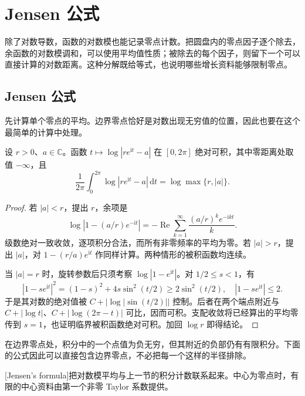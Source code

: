 \section{Jensen 公式}
\label{b3:sec:1802}

除了对数导数，函数的对数模也能记录零点计数。把圆盘内的零点因子逐个除去，余函数的对数模调和，可以使用平均值性质；被除去的每个因子，则留下一个可以直接计算的对数距离。这种分解既给等式，也说明哪些增长资料能够限制零点。

\subsection{Jensen 公式}
\label{b3:subsec:180201}

先计算单个零点的平均。边界零点恰好是对数出现无穷值的位置，因此也要在这个最简单的计算中处理。

\begin{lemma}[圆周对数平均]\label{b3:lem:18-circle-log-mean}
设 \(r>0\)、\(a\in\mathbb C\)。函数 \(t\mapsto\log|re^{\mathrm it}-a|\) 在 \([0,2\pi]\) 绝对可积，其中零距离处取值 \(-\infty\)，且
\begin{equation}\label{b3:eq:18-circle-log-mean}
 \frac1{2\pi}\int_0^{2\pi}\log|re^{\mathrm it}-a|\,\mathrm dt
 =\log\max\{r,|a|\}.
\end{equation}
\end{lemma}
\begin{proof}
若 \(|a|<r\)，提出 \(r\)，余项是
\[
 \log|1-(a/r)e^{-\mathrm it}|
 =-\operatorname{Re}\sum_{k=1}^{\infty}
       \frac{(a/r)^k e^{-\mathrm ikt}}k.
\]
级数绝对一致收敛，逐项积分合法，而所有非零频率的平均为零。若 \(|a|>r\)，提出 \(|a|\)，对 \(1-(r/a)e^{\mathrm it}\) 作同样计算。两种情形的被积函数均连续。

当 \(|a|=r\) 时，旋转参数后只须考察 \(\log|1-e^{\mathrm it}|\)。对 \(1/2\le s<1\)，有
\[
 |1-se^{\mathrm it}|^2=(1-s)^2+4s\sin^2(t/2)
 \ge2\sin^2(t/2),\quad |1-se^{\mathrm it}|\le2.
\]
于是其对数的绝对值被
\(C+|\log|\sin(t/2)||\) 控制。后者在两个端点附近与
\(C+|\log t|\)、\(C+|\log(2\pi-t)|\) 可比，因而可积。支配收敛将已经算出的平均零传到 \(s=1\)，也证明临界被积函数绝对可积。加回 \(\log r\) 即得结论。
\end{proof}

在边界零点处，积分中的一个点值为负无穷，但其附近的负部仍有有限积分。下面的公式因此可以直接包含边界零点，不必把每一个这样的半径排除。

\ProseParagraphBreak
{}[Jensen's formula]把对数模平均与上一节的积分计数联系起来。中心为零点时，有限的中心资料由第一个非零 Taylor 系数提供。

